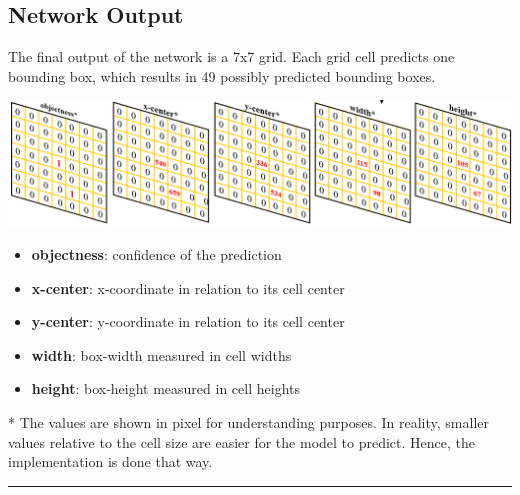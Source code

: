 \documentclass[landscape,a2,final,12pt]{issposter}
\begin{document}
\begin{multicols}{3}
\section{Network Output}
    \begin{small}
        The final output of the network is a 7x7 grid. Each grid cell predicts one bounding box, which results in 49 possibly predicted bounding boxes.
    \end{small}
    \begin{center}
        \includegraphics[scale=0.55]{3_channels.png}
    \end{center}
    \begin{small}
        \begin{itemize}
            \item {\textbf{objectness}: confidence of the prediction}
            \item {\textbf{x-center}: x-coordinate in relation to its cell center}
            \item {\textbf{y-center}: y-coordinate in relation to its cell center}
            \item {\textbf{width}: box-width measured in cell widths}
            \item {\textbf{height}: box-height measured in cell heights}
        \end{itemize}
    \end{small}
    \begin{footnotesize}
        * The values are shown in pixel for understanding purposes. In reality, smaller values relative to the cell size are easier for the model to predict. Hence, the implementation is done that way.
    \end{footnotesize}
    
\end{multicols}


\rule{\textwidth}{8pt}
\end{document}
